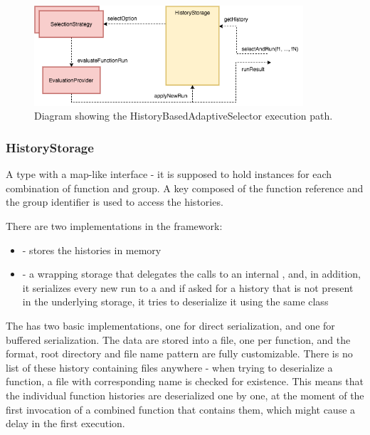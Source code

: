 \begin{figure}[h!]
	\captionsetup{justification=centering,margin=0.5cm}
	\centerline{\mbox{\includegraphics[width=100mm]{./img/history_based_selector.png}}}
	\caption{Diagram showing the HistoryBasedAdaptiveSelector execution path.}
	\label{fig:history_based_selector}
\end{figure}

\subsubsection{HistoryStorage}

A type with a map-like interface - it is supposed to hold  instances for each combination of function and group. A key composed of the function reference and the group identifier is used to access the histories.

There are two implementations in the framework:

\begin{itemize}
	\item {} - stores the histories in memory
	\item {} - a wrapping storage that delegates the calls to an internal , and, in addition, it serializes every new run to a  and if asked for a history that is not present in the underlying storage, it tries to deserialize it using the same class
\end{itemize}

The  has two basic implementations, one for direct serialization, and one for buffered serialization. The data are stored into a file, one per function, and the format, root directory and file name pattern are fully customizable. There is no list of these history containing files anywhere - when trying to deserialize a function, a file with corresponding name is checked for existence. This means that the individual function histories are deserialized one by one, at the moment of the first invocation of a combined function that contains them, which might cause a delay in the first execution.


